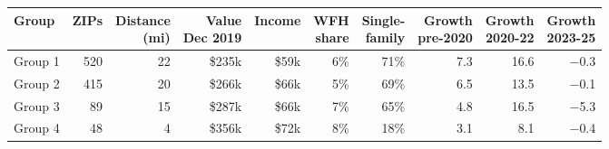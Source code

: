 \footnotesize\setlength{\tabcolsep}{4pt}
\begin{tabular}{lrrrrrrrrr}
\toprule
Group & ZIPs & \shortstack[r]{Distance\\(mi)} & \shortstack[r]{Value\\Dec 2019} & Income & \shortstack[r]{WFH\\share} & \shortstack[r]{Single-\\family} & \shortstack[r]{Growth\\pre-2020} & \shortstack[r]{Growth\\2020-22} & \shortstack[r]{Growth\\2023-25} \\
\midrule
Group 1 & 520 & 22 & \$235k & \$59k & 6\% & 71\% & 7.3 & 16.6 & $-$0.3 \\
Group 2 & 415 & 20 & \$266k & \$66k & 5\% & 69\% & 6.5 & 13.5 & $-$0.1 \\
Group 3 & 89 & 15 & \$287k & \$66k & 7\% & 65\% & 4.8 & 16.5 & $-$5.3 \\
Group 4 & 48 & 4 & \$356k & \$72k & 8\% & 18\% & 3.1 & 8.1 & $-$0.4 \\
\bottomrule
\end{tabular}

